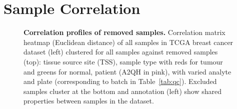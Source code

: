 \appendix


\chapter{Sample Correlation}
\label{appendix:sample_correlation}

\begin{figure}[!ht]
\begin{mdframed}
  \begin{center}
   \end{center}
   \caption[Correlation profiles of removed samples]{\small \textbf{Correlation profiles of removed samples.} Correlation matrix heatmap (Euclidean distance) of all samples in TCGA breast cancer dataset (left) clustered for all samples against removed samples (top): tissue source site (TSS), sample type with reds for tumour and greens for normal, patient (A2QH in pink), with varied analyte and plate (corresponding to batch in Table~\ref{tab:qc}). Excluded samples cluster at the bottom and annotation (left) show  shared properties between samples in the dataset.}
\label{fig:corr_map_part}
\end{mdframed}
\end{figure}

